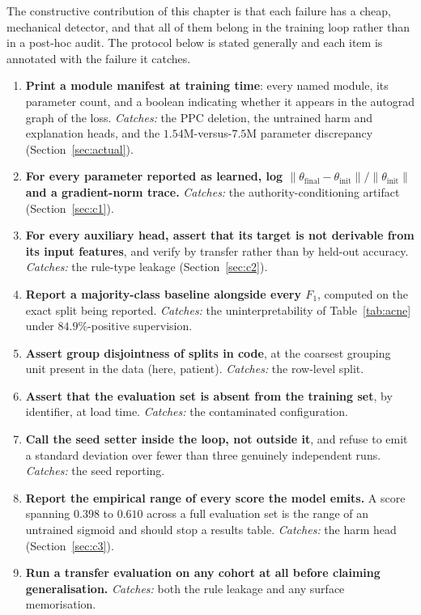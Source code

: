 The constructive contribution of this chapter is that each failure has a cheap,
mechanical detector, and that all of them belong in the training loop rather
than in a post-hoc audit. The protocol below is stated generally and each item
is annotated with the failure it catches.

\begin{enumerate}
\item \textbf{Print a module manifest at training time}: every named module,
      its parameter count, and a boolean indicating whether it appears in the
      autograd graph of the loss. \emph{Catches:} the PPC deletion, the
      untrained harm and explanation heads, and the $1.54$M-versus-$7.5$M
      parameter discrepancy (Section~\ref{sec:actual}).
\item \textbf{For every parameter reported as learned, log
      $\lVert\theta_{\text{final}} - \theta_{\text{init}}\rVert /
      \lVert\theta_{\text{init}}\rVert$ and a gradient-norm trace.}
      \emph{Catches:} the authority-conditioning artifact
      (Section~\ref{sec:c1}).
\item \textbf{For every auxiliary head, assert that its target is not derivable
      from its input features}, and verify by transfer rather than by held-out
      accuracy. \emph{Catches:} the rule-type leakage
      (Section~\ref{sec:c2}).
\item \textbf{Report a majority-class baseline alongside every $F_1$}, computed
      on the exact split being reported. \emph{Catches:} the uninterpretability
      of Table~\ref{tab:acne} under $84.9\%$-positive supervision.
\item \textbf{Assert group disjointness of splits in code}, at the coarsest
      grouping unit present in the data (here, patient). \emph{Catches:} the
      row-level split.
\item \textbf{Assert that the evaluation set is absent from the training set},
      by identifier, at load time. \emph{Catches:} the contaminated
      configuration.
\item \textbf{Call the seed setter inside the loop, not outside it}, and refuse
      to emit a standard deviation over fewer than three genuinely independent
      runs. \emph{Catches:} the seed reporting.
\item \textbf{Report the empirical range of every score the model emits.} A
      score spanning $0.398$ to $0.610$ across a full evaluation set is the
      range of an untrained sigmoid and should stop a results table.
      \emph{Catches:} the harm head (Section~\ref{sec:c3}).
\item \textbf{Run a transfer evaluation on any cohort at all before claiming
      generalisation.} \emph{Catches:} both the rule leakage and any surface
      memorisation.
\end{enumerate}

